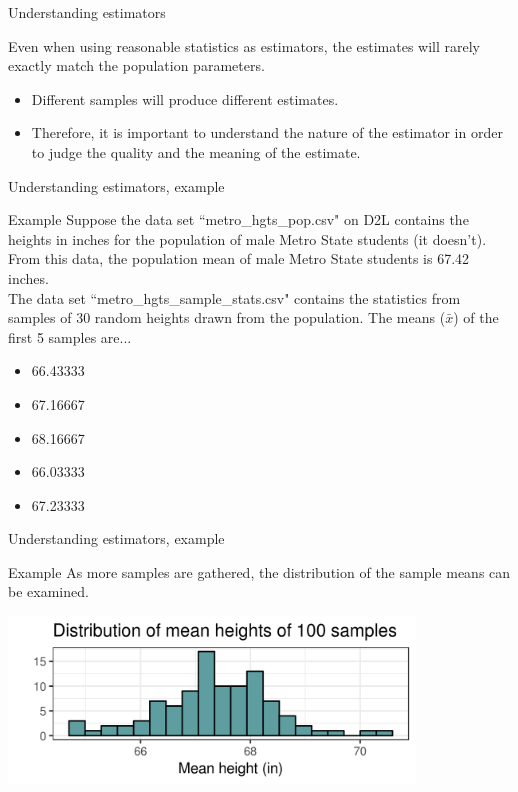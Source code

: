 \documentclass[xcolor=table, aspectratio=169, bigger, handout]{beamer}
\begin{document}
\begin{frame}{Understanding estimators}
\begin{block}{}
Even when using reasonable statistics as estimators, the estimates will rarely exactly match the population parameters.

\begin{itemize}
\item Different samples will produce different estimates.
\item Therefore, it is important to understand the nature of the estimator in order to judge the quality and the meaning of the estimate.
\end{itemize}
\end{block}
\end{frame}

\begin{frame}{Understanding estimators, example}
\begin{exampleblock}{Example}
Suppose the data set ``metro\_hgts\_pop.csv" on D2L contains the heights in inches for the population of male Metro State students (it doesn't). From this data, the population mean of male Metro State students is 67.42 inches.\\ \medskip
\pause
The data set ``metro\_hgts\_sample\_stats.csv" contains the statistics from samples of 30 random heights drawn from the population. The means ($\bar x$) of the first 5 samples are...\\ \smallskip
\begin{itemize}
\pause\item 66.43333 
\pause\item 67.16667 
\pause\item 68.16667 
\pause\item 66.03333 
\pause\item 67.23333
\end{itemize}
 
\end{exampleblock}
\end{frame}

\begin{frame}{Understanding estimators, example}
\begin{exampleblock}{Example}
As more samples are gathered, the distribution of the sample means can be examined.
\end{exampleblock}
\bigskip
{\centering
\includegraphics[width=4.25in]{../images/wk07_metro_hgts_hist}
\par}

\end{frame}
\end{document}
